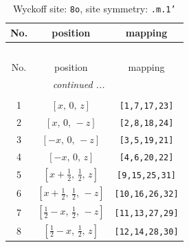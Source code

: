 \documentclass[fleqn,8pt]{jsarticle}
\begin{document}
\begin{longtable}{ccc}
\caption{Wyckoff site: {\tt 8o}, site symmetry: {\tt .m.1'}}
 \\
 \hline \hline
No. & position & mapping \\ \hline \endfirsthead

\multicolumn{2}{l}{\tablename\ \thetable{}} \\
 \hline \hline
No. & position & mapping \\ \hline \endhead

 \hline \hline
\multicolumn{2}{r}{\footnotesize\it continued ...} \\ \endfoot

 \hline \hline
\multicolumn{2}{r}{} \\ \endlastfoot

1 & $\left[ x,\, 0,\, z \right]$ & {\tt [1,7,17,23]} \\ \hline
2 & $\left[ x,\, 0,\, - z \right]$ & {\tt [2,8,18,24]} \\ \hline
3 & $\left[ - x,\, 0,\, - z \right]$ & {\tt [3,5,19,21]} \\ \hline
4 & $\left[ - x,\, 0,\, z \right]$ & {\tt [4,6,20,22]} \\ \hline
5 & $\left[ x + \frac{1}{2},\, \frac{1}{2},\, z \right]$ & {\tt [9,15,25,31]} \\ \hline
6 & $\left[ x + \frac{1}{2},\, \frac{1}{2},\, - z \right]$ & {\tt [10,16,26,32]} \\ \hline
7 & $\left[ \frac{1}{2} - x,\, \frac{1}{2},\, - z \right]$ & {\tt [11,13,27,29]} \\ \hline
8 & $\left[ \frac{1}{2} - x,\, \frac{1}{2},\, z \right]$ & {\tt [12,14,28,30]} \\
\end{longtable}
\renewcommand{\arraystretch}{1.2}
\end{document}
